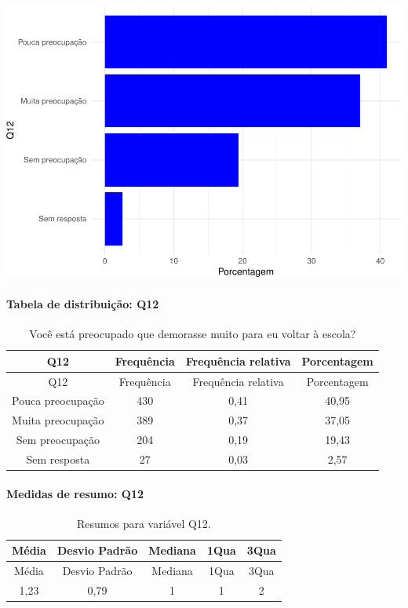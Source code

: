 \documentclass[]{article}
\let\oldparagraph\paragraph
\renewcommand{\paragraph}[1]{\oldparagraph{#1}\mbox{}}
\begin{document}
\begin{center}\includegraphics[width=0.75\linewidth]{relatorio_files/figure-latex/unnamed-chunk-14-1} \end{center}

\hypertarget{tabela-de-distribuiuxe7uxe3o-q12}{%
\paragraph{Tabela de distribuição: Q12}\label{tabela-de-distribuiuxe7uxe3o-q12}}

\begin{longtable}[]{@{}cccc@{}}
\caption{\label{tab:unnamed-chunk-15}Você está preocupado que demorasse muito para eu voltar à escola?}\tabularnewline
\toprule
Q12 & Frequência & Frequência relativa & Porcentagem\tabularnewline
\midrule
\endfirsthead
\toprule
Q12 & Frequência & Frequência relativa & Porcentagem\tabularnewline
\midrule
\endhead
Pouca preocupação & 430 & 0,41 & 40,95\tabularnewline
Muita preocupação & 389 & 0,37 & 37,05\tabularnewline
Sem preocupação & 204 & 0,19 & 19,43\tabularnewline
Sem resposta & 27 & 0,03 & 2,57\tabularnewline
\bottomrule
\end{longtable}

\hypertarget{medidas-de-resumo-q12}{%
\paragraph{Medidas de resumo: Q12}\label{medidas-de-resumo-q12}}

\begin{longtable}[]{@{}ccccc@{}}
\caption{\label{tab:unnamed-chunk-16}Resumos para variável Q12.}\tabularnewline
\toprule
Média & Desvio Padrão & Mediana & 1Qua & 3Qua\tabularnewline
\midrule
\endfirsthead
\toprule
Média & Desvio Padrão & Mediana & 1Qua & 3Qua\tabularnewline
\midrule
\endhead
1,23 & 0,79 & 1 & 1 & 2\tabularnewline
\bottomrule
\end{longtable}
\end{document}
